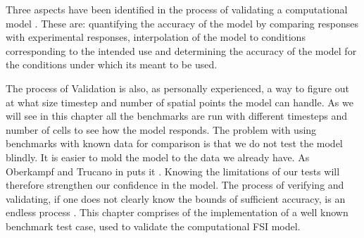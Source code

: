 Three aspects have been identified in the process of validating a computational model \cite{Selin2014}. These are: quantifying the accuracy of the model by comparing responses with experimental responses, interpolation of the model to conditions corresponding to the intended use and determining the accuracy of the model for the conditions under which its meant to be used. \newline

The process of Validation is also, as personally experienced, a way to figure out at what size timestep and number of spatial points the model can handle. As we will see in this chapter all the benchmarks are run with different timesteps and number of cells to see how the model responds. The problem with using benchmarks with known data for comparison is that we do not test the model blindly. It is easier to mold the model to the data we already have. As Oberkampf and Trucano in \cite{Selin2014} puts it . Knowing the limitations of our tests will therefore strengthen our confidence in the model. The process of verifying and validating, if one does not clearly know the bounds of sufficient accuracy, is an endless process \cite{Selin2014}. 
This chapter comprises of the implementation of a well known benchmark test case, used to validate the computational FSI model.


%











